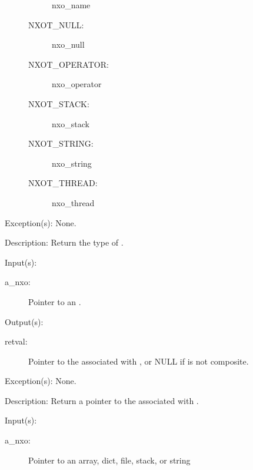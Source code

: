 \begin{capi}
\begin{capilist}
\begin{description}
\begin{description}
					{nxo_name}
				\item[NXOT\_NULL: ]
					{nxo_null}
				\item[NXOT\_OPERATOR: ]
					{nxo_operator}
				\item[NXOT\_STACK: ]
					{nxo_stack}
				\item[NXOT\_STRING: ]
					{nxo_string}
				\item[NXOT\_THREAD: ]
					{nxo_thread}
			\end{description}
		\end{description}
	\item[Exception(s): ] None.
	\item[Description: ]
		Return the type of .
	\end{capilist}
\label{nxo_nxoe_get}
	\begin{capilist}
	\item[Input(s): ]
		\begin{description}\item[]
		\item[a\_nxo: ]
			Pointer to an .
		\end{description}
	\item[Output(s): ]
		\begin{description}\item[]
		\item[retval: ]
			Pointer to the  associated with
			, or NULL if  is not
			composite.
		\end{description}
	\item[Exception(s): ] None.
	\item[Description: ]
		Return a pointer to the  associated with
		.
	\end{capilist}
\label{nxo_lcheck}
	\begin{capilist}
	\item[Input(s): ]
		\begin{description}\item[]
		\item[a\_nxo: ]
			Pointer to an array, dict, file, stack, or string

\end{description}
\end{capilist}
\end{capi}
